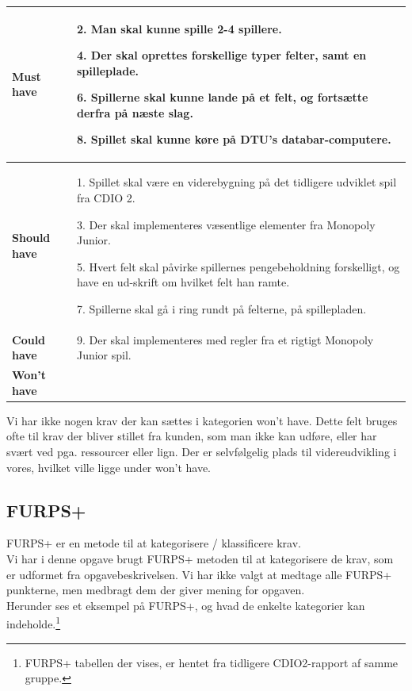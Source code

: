 \begin{center}
    \begin{tabular}{ | l | p{13cm} |}
    \hline
    \textbf{Must have}
    &        
        2. Man skal kunne spille 2-4 spillere.

        4. Der skal oprettes forskellige typer felter, samt en spilleplade.
        
        6. Spillerne skal kunne lande på et felt, og fortsætte derfra på næste slag.
        
        8. Spillet skal kunne køre på DTU’s databar-computere.
    \\
    
    \hline
    \textbf{Should have}
    &
        1. Spillet skal være en viderebygning på det tidligere udviklet spil fra CDIO 2.

        3. Der skal implementeres væsentlige elementer fra Monopoly Junior.

        5. Hvert felt skal påvirke spillernes pengebeholdning forskelligt, og have en ud-skrift om hvilket felt han ramte.

        7. Spillerne skal gå i ring rundt på felterne, på spillepladen.
    \\
    \hline
    \textbf{Could have}
    &
        9. Der skal implementeres med regler fra et rigtigt Monopoly Junior spil.
    \\
    \hline
    \textbf{Won't have}
    &

    \\
    \hline
    \end{tabular}
\end{center}

\noindent Vi har ikke nogen krav der kan sættes i kategorien won't have.
Dette felt bruges ofte til krav der bliver stillet fra kunden, som man ikke kan udføre, eller har svært ved pga. ressourcer eller lign.
Der er selvfølgelig plads til videreudvikling i vores, hvilket ville ligge under won't have. 

\subsection{FURPS+}

FURPS+ er en metode til at kategorisere / klassificere krav. \\
Vi har i denne opgave brugt FURPS+ metoden til at kategorisere de krav, som er udformet fra opgavebeskrivelsen.
Vi har ikke valgt at medtage alle FURPS+ punkterne, men medbragt dem der giver mening for opgaven. \\
Herunder ses et eksempel på FURPS+, og hvad de enkelte kategorier kan indeholde.\footnote{FURPS+ tabellen der vises, er hentet fra tidligere CDIO2-rapport af samme gruppe.}


